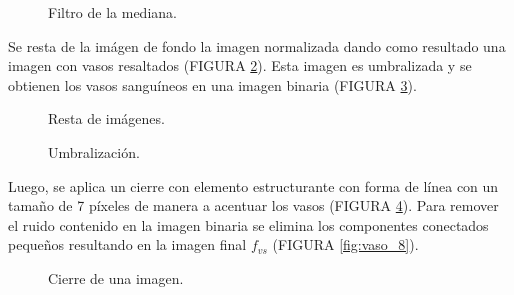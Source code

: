 \begin{figure}[H]
\centering
{}
\caption{Filtro de la mediana.} \label{fig:vaso_4}
\end{figure}


 Se resta de la imágen de fondo la imagen normalizada dando como resultado una imagen con vasos resaltados (FIGURA \ref{fig:vaso_5}). Esta imagen es umbralizada y se obtienen los vasos sanguíneos en una imagen binaria (FIGURA \ref{fig:vaso_6}).
\begin{figure}[H]
\centering
{}
\caption{Resta de imágenes.} \label{fig:vaso_5}
\end{figure}


 
\begin{figure}[H]
\centering
{}
\caption{Umbralización.} \label{fig:vaso_6}
\end{figure}

Luego, se aplica un cierre con elemento estructurante con forma de línea con un tamaño de 7 píxeles de manera a acentuar los vasos (FIGURA \ref{fig:vaso_7}). Para remover el ruido contenido en la imagen binaria se elimina los componentes conectados pequeños resultando en la imagen final $f_{vs}$ (FIGURA \ref{fig:vaso_8}). 

\begin{figure}[H]
\centering
{}
\caption{Cierre de una imagen.} \label{fig:vaso_7}
\end{figure}

